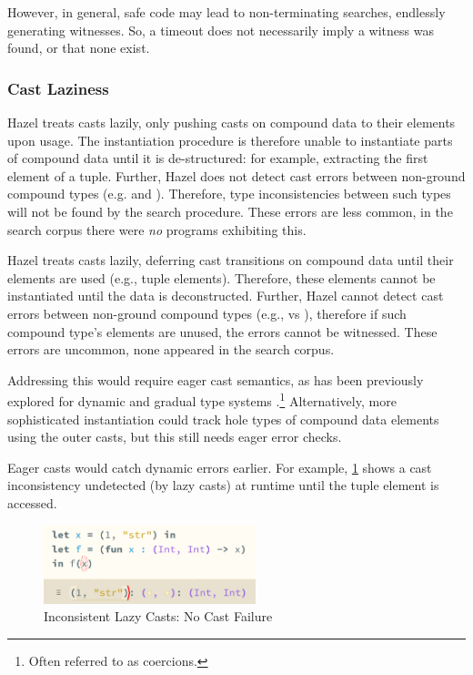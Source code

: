However, in general, safe code may lead to non-terminating searches, endlessly generating witnesses. So, a timeout does not necessarily imply a witness was found, or that none exist.

\subsubsection{Cast Laziness}\label{sec:EvalCastLaziness}
Hazel treats casts lazily, only pushing casts on compound data to their elements upon usage. The instantiation procedure is therefore unable to instantiate parts of compound data until it is de-structured: for example, extracting the first element of a tuple. Further, Hazel does not detect cast errors between non-ground compound types (e.g. \code{[Int]} and \code{[String]}). Therefore, type inconsistencies between such types will not be found by the search procedure. These errors are less common, in the search corpus there were \textit{no} programs exhibiting this.

Hazel treats casts lazily, deferring cast transitions on compound data until their elements are used (e.g., tuple elements). Therefore, these elements cannot be instantiated until the data is deconstructed. Further, Hazel cannot detect cast errors between non-ground compound types (e.g., \code{[Int]} vs \code{[String]}), therefore if such compound type's elements are unused, the errors cannot be witnessed. These errors are uncommon, none appeared in the search corpus.

Addressing this would require eager cast semantics, as has been previously explored for dynamic and gradual type systems \cite{EagerCasts, GradualEagerCasts}.\footnote{Often referred to as coercions.} Alternatively, more sophisticated instantiation could track hole types of compound data elements using the outer casts, but this still needs eager error checks.

Eager casts would catch dynamic errors earlier. For example, \cref{fig:LazyCastError} shows a cast inconsistency undetected (by lazy casts) at runtime until the tuple element is accessed.
\begin{figure}[h]
\centering
\includegraphics[width=0.55\textwidth]{Media/Figures/cast_laziness_no_error}
\caption{Inconsistent Lazy Casts: No Cast Failure}
\label{fig:LazyCastError}
\end{figure}


